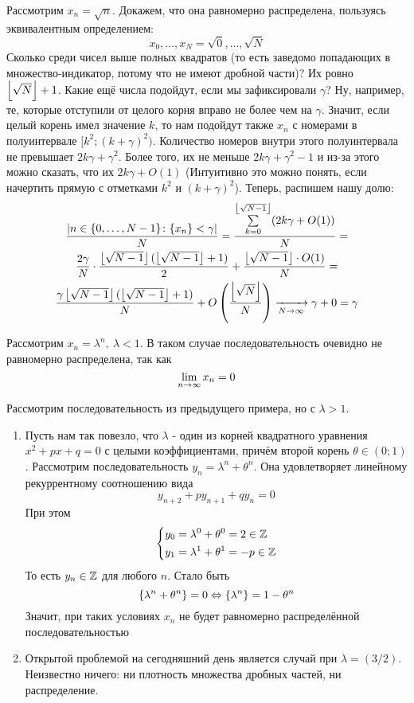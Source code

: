 \begin{example}
	Рассмотрим $x_n = \sqrt{n}$. Докажем, что она равномерно распределена, пользуясь эквивалентным определением:
	\[
		x_0, \ldots, x_N = \sqrt{0}, \ldots, \sqrt{N}
	\]
	Сколько среди чисел выше полных квадратов (то есть заведомо попадающих в множество-индикатор, потому что не имеют дробной части)? Их ровно $\left\lfloor \sqrt{N} \right\rfloor + 1$. Какие ещё числа подойдут, если мы зафиксировали $\gamma$? Ну, например, те, которые отступили от целого корня вправо не более чем на $\gamma$. Значит, если целый корень имел значение $k$, то нам подойдут также $x_n$ с номерами в полуинтервале $[k^2; (k + \gamma)^2)$. Количество номеров внутри этого полуинтервала не превышает $2k\gamma + \gamma^2$. Более того, их не меньше $2k\gamma + \gamma^2 - 1$ и из-за этого можно сказать, что их $2k\gamma + O(1)$ (Интуитивно это можно понять, если начертить прямую с отметками $k^2$ и $(k + \gamma)^2$). Теперь, распишем нашу долю:
	\begin{multline*}
		\frac{|n \in \{0, \ldots, N - 1\} \colon \{x_n\} < \gamma|}{N} = \frac{\sum\limits_{k = 0}^{\left\lfloor \sqrt{N - 1} \right\rfloor} (2k\gamma + O(1))}{N} =
		\\
		\frac{2\gamma}{N} \cdot \frac{\left\lfloor \sqrt{N - 1} \right\rfloor (\left\lfloor \sqrt{N - 1} \right\rfloor + 1)}{2} + \frac{\left\lfloor \sqrt{N - 1} \right\rfloor \cdot O(1)}{N} =
		\\
		\frac{\gamma \left\lfloor \sqrt{N - 1} \right\rfloor(\left\lfloor \sqrt{N - 1} \right\rfloor + 1)}{N} + O\left(\frac{\left\lfloor \sqrt{N} \right\rfloor}{N}\right) \xrightarrow[N \to \infty]{} \gamma + 0 = \gamma
	\end{multline*}
\end{example}

\begin{example}
	Рассмотрим $x_n = \lambda^n,\ \lambda < 1$. В таком случае последовательность очевидно не равномерно распределена, так как
	\[
		\lim\limits_{n \to \infty} x_n = 0
	\]
\end{example}

\begin{example}
	Рассмотрим последовательность из предыдущего примера, но с $\lambda > 1$.
	\begin{enumerate}
		\item Пусть нам так повезло, что $\lambda$ - один из корней квадратного уравнения $x^2 + px + q = 0$ с целыми коэффициентами, причём второй корень $\theta \in (0; 1)$. Рассмотрим последовательность $y_n = \lambda^n + \theta^n$. Она удовлетворяет линейному рекуррентному соотношению вида
		\[
			y_{n + 2} + py_{n + 1} + qy_n = 0
		\]
		При этом
		\[
			\left\{\begin{aligned}
				&{y_0 = \lambda^0 + \theta^0 = 2 \in \mathbb{Z}}
				\\
				&{y_1 = \lambda^1 + \theta^1 = -p \in \mathbb{Z}}
			\end{aligned}\right.
		\]
		То есть $y_n \in \mathbb{Z}$ для любого $n$. Стало быть
		\[
			\{\lambda^n + \theta^n\} = 0 \Leftrightarrow \{\lambda^n\} = 1 - \theta^n
		\]
		Значит, при таких условиях $x_n$ не будет равномерно распределённой последовательностью
		
		\item Открытой проблемой на сегодняшний день является случай при $\lambda = (3/2)$. Неизвестно ничего: ни плотность множества дробных частей, ни распределение.
	\end{enumerate}
\end{example}

